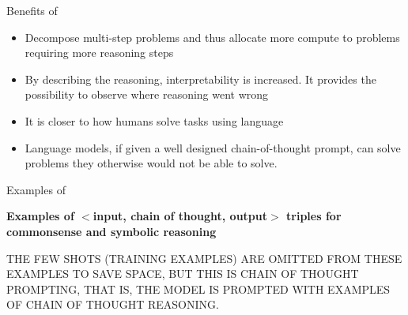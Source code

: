 

\begin{vbframe}{Benefits of \cotpfull}

\vfill

\begin{itemize}
    \item Decompose multi-step problems and thus allocate more compute to problems requiring more reasoning steps
    \item By describing the reasoning, interpretability is increased. It provides the possibility to observe where reasoning went wrong
    \item It is closer to how humans solve tasks using language
    \item Language models, if
given a well designed chain-of-thought prompt, can
    solve problems they otherwise would not be able to solve.
\end{itemize}

\vfill

\end{vbframe}



\begin{vbframe}{Examples of \cotpfull}

\vfill

\textbf{Examples of $<$input, chain of thought, output$>$ triples for  commonsense and symbolic reasoning}


THE FEW SHOTS (TRAINING EXAMPLES) ARE OMITTED FROM THESE
EXAMPLES TO SAVE SPACE, BUT THIS IS CHAIN OF THOUGHT
PROMPTING, THAT IS, THE MODEL IS PROMPTED WITH EXAMPLES OF
CHAIN OF THOUGHT REASONING.


\vfill

\end{vbframe}


